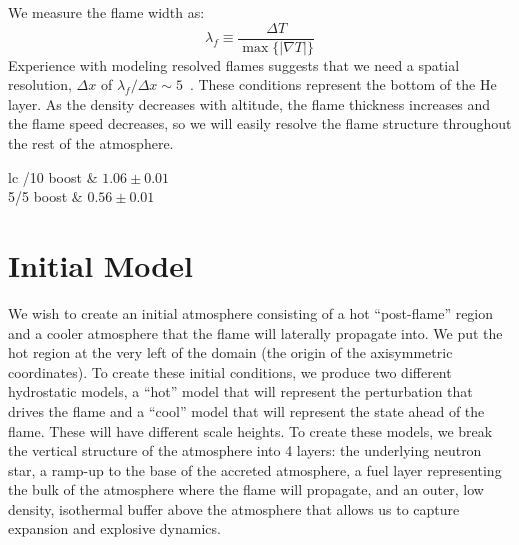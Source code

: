 \documentclass[preprint,times,tighten]{aastex63}
\begin{document}
We measure the flame width as:
\begin{equation}
\lambda_f \equiv \frac{\Delta T}{\max\{|\nabla T|\}}
\end{equation}
Experience with modeling resolved flames suggests that we need a
spatial resolution, $\Delta x$ of $\lambda_f/\Delta x \sim 5$~\citep{SNld}.  These
conditions represent the bottom of the He layer.  As the density
decreases with altitude, the flame thickness increases and the flame
speed decreases, so we will easily resolve the flame structure throughout
the rest of the atmosphere.

\begin{deluxetable}{lc}
	/10 boost & $1.06 \pm 0.01$ \\
	5/5 boost & $0.56 \pm 0.01$ \\
	\enddata
\end{deluxetable}

\section{Initial Model}\label{Sec:inital_model}


We wish to create an initial atmosphere consisting of a hot
``post-flame'' region and a cooler atmosphere that the flame will
laterally propagate into.  We put the hot region at the very left of
the domain (the origin of the axisymmetric coordinates).  To create
these initial conditions, we produce two different hydrostatic models,
a ``hot'' model that will represent the perturbation that drives the
flame and a ``cool'' model that will represent the state ahead of the
flame.  These will have different scale heights.  To create these
models, we break the vertical structure of the atmosphere into 4
layers: the underlying neutron star, a ramp-up to the base of the
accreted atmosphere, a fuel layer representing the bulk of the
atmosphere where the flame will propagate, and an outer, low density,
isothermal buffer above the atmosphere that allows us
to capture expansion and explosive dynamics.  
\end{document}
